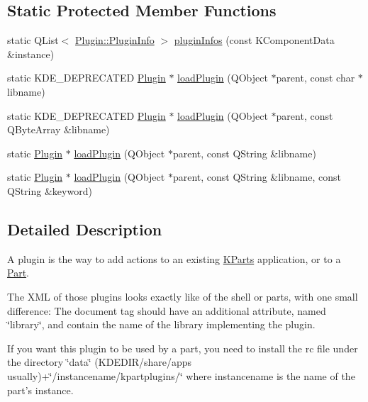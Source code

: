 \subsection*{\-Static \-Protected \-Member \-Functions}
\begin{DoxyCompactItemize}
\item 
static \-Q\-List$<$ \hyperlink{structKParts_1_1Plugin_1_1PluginInfo}{\-Plugin\-::\-Plugin\-Info} $>$ \hyperlink{classKParts_1_1Plugin_a00fa7c83044416dbe32dcef7672fb7a5}{plugin\-Infos} (const \-K\-Component\-Data \&instance)
\item 
static \-K\-D\-E\-\_\-\-D\-E\-P\-R\-E\-C\-A\-T\-E\-D \hyperlink{classKParts_1_1Plugin}{\-Plugin} $\ast$ \hyperlink{classKParts_1_1Plugin_adf61fe555a87f5ad3bf84c5e16a97e31}{load\-Plugin} (\-Q\-Object $\ast$parent, const char $\ast$libname)
\item 
static \-K\-D\-E\-\_\-\-D\-E\-P\-R\-E\-C\-A\-T\-E\-D \hyperlink{classKParts_1_1Plugin}{\-Plugin} $\ast$ \hyperlink{classKParts_1_1Plugin_a1479723a42f26aa8b4fd843e00976d5b}{load\-Plugin} (\-Q\-Object $\ast$parent, const \-Q\-Byte\-Array \&libname)
\item 
static \hyperlink{classKParts_1_1Plugin}{\-Plugin} $\ast$ \hyperlink{classKParts_1_1Plugin_ae2c2c4b6f736f5236bc5d4f2b20710a1}{load\-Plugin} (\-Q\-Object $\ast$parent, const \-Q\-String \&libname)
\item 
static \hyperlink{classKParts_1_1Plugin}{\-Plugin} $\ast$ \hyperlink{classKParts_1_1Plugin_a7fef84c255c7ed61b4548258fbaf3a68}{load\-Plugin} (\-Q\-Object $\ast$parent, const \-Q\-String \&libname, const \-Q\-String \&keyword)
\end{DoxyCompactItemize}


\subsection{\-Detailed \-Description}
\-A plugin is the way to add actions to an existing \hyperlink{namespaceKParts}{\-K\-Parts} application, or to a \hyperlink{classKParts_1_1Part}{\-Part}.

\-The \-X\-M\-L of those plugins looks exactly like of the shell or parts, with one small difference\-: \-The document tag should have an additional attribute, named \char`\"{}library\char`\"{}, and contain the name of the library implementing the plugin.

\-If you want this plugin to be used by a part, you need to install the rc file under the directory \char`\"{}data\char`\"{} (\-K\-D\-E\-D\-I\-R/share/apps usually)+\char`\"{}/instancename/kpartplugins/\char`\"{} where instancename is the name of the part's instance.


